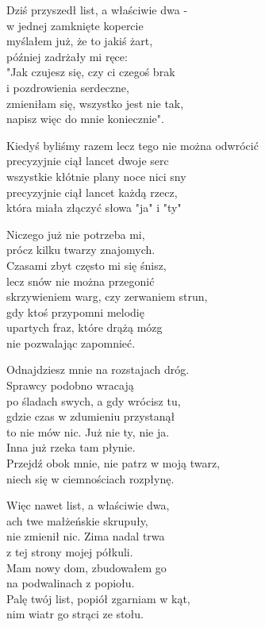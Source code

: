 \begin{text}
    Dziś przyszedł list, a właściwie dwa -\\
    w jednej zamknięte kopercie\\
    myślałem już, że to jakiś żart,\\
    później zadrżały mi ręce:\\
    "Jak czujesz się, czy ci czegoś brak\\
    i pozdrowienia serdeczne,\\
    zmieniłam się, wszystko jest nie tak,\\
    napisz więc do mnie koniecznie".

    Kiedyś byliśmy razem lecz tego nie można odwrócić\\
    precyzyjnie ciął lancet dwoje serc\\
    wszystkie kłótnie plany noce nici sny\\
    precyzyjnie ciął lancet każdą rzecz,\\
    która miała złączyć słowa "ja" i "ty"

    Niczego już nie potrzeba mi,\\
    prócz kilku twarzy znajomych.\\
    Czasami zbyt często mi się śnisz,\\
    lecz snów nie można przegonić\\
    skrzywieniem warg, czy zerwaniem strun,\\
    gdy ktoś przypomni melodię\\
    upartych fraz, które drążą mózg\\
    nie pozwalając zapomnieć.

    Odnajdziesz mnie na rozstajach dróg.\\
    Sprawcy podobno wracają\\
    po śladach swych, a gdy wrócisz tu,\\
    gdzie czas w zdumieniu przystanął\\
    to nie mów nic. Już nie ty, nie ja.\\
    Inna już rzeka tam płynie.\\
    Przejdź obok mnie, nie patrz w moją twarz,\\
    niech się w ciemnościach rozpłynę.

    Więc nawet list, a właściwie dwa,\\
    ach twe małżeńskie skrupuły,\\
    nie zmienił nic. Zima nadal trwa\\
    z tej strony mojej półkuli.\\
    Mam nowy dom, zbudowałem go\\
    na podwalinach z popiołu.\\
    Palę twój list, popiół zgarniam w kąt,\\
    nim wiatr go strąci ze stołu.
\end{text}
